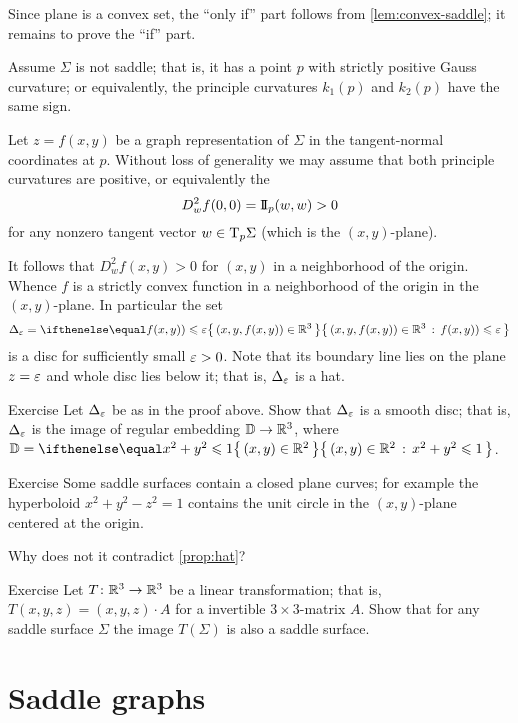 Since plane is a convex set, the ``only if'' part follows from \ref{lem:convex-saddle};
it remains to prove the ``if'' part.

Assume $\Sigma$ is not saddle; that is, it has a point $p$ with strictly positive Gauss curvature;
or equivalently, the principle curvatures $k_1(p)$ and $k_2(p)$ have the same sign.

Let $z=f(x,y)$ be a graph representation of $\Sigma$ in the tangent-normal coordinates at $p$.
Without loss of generality we may assume that both principle curvatures are positive,
or equivalently the 
\[D^2_wf(0,0)=\mathrm{I}\!\mathrm{I}_p(w,w)>0\] 
for any nonzero tangent vector $w\in\mathrm{T}_p\Sigma$ (which is the $(x,y)$-plane).

It follows that $D^2_wf(x,y)>0$ for $(x,y)$ in a neighborhood of the origin.
Whence $f$ is a strictly convex function in a neighborhood of the origin in the $(x,y)$-plane.
In particular the set 
\[\Delta_\eps=\set{(x,y,f(x,y))\in \RR^3}{f(x,y))\le \eps}\]
is a disc for sufficiently small $\varepsilon>0$. %
Note that its boundary line lies on the plane $z=\varepsilon$ and whole disc lies below it;
that is, $\Delta_\varepsilon$ is a hat.
\qeds

\begin{thm}{Exercise}
Let $\Delta_\varepsilon$ be as in the proof above.
Show that $\Delta_\varepsilon$ is a smooth disc; that is, $\Delta_\varepsilon$ is the image of regular embedding $\mathbb{D}\to \mathbb{R}^3$, where $\DD=\set{(x,y)\in\RR^2}{x^2+y^2\le 1}$.
\end{thm}


\begin{thm}{Exercise}
Some saddle surfaces contain a closed plane curves;
for example the hyperboloid $x^2+y^2-z^2=1$ contains the unit circle in the $(x,y)$-plane centered at the origin.

Why does not it contradict \ref{prop:hat}?
\end{thm}

\begin{thm}{Exercise}\label{ex:saddle-linear}
Let $T\colon\mathbb{R}^3\to\mathbb{R}^3$ be a linear transformation; that is, $T(x,y,z)=(x,y,z)\cdot A$ for a invertible $3{\times}3$-matrix $A$. 
Show that for any saddle surface $\Sigma$ the image $T(\Sigma)$ is also a saddle surface.
\end{thm}

\section*{Saddle graphs}

